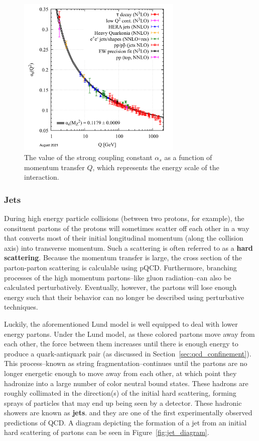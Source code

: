 \begin{figure}
    \centering
    \includegraphics[width=0.7\textwidth]{figures/introduction/running_coupling.png}
    \caption{The value of the strong coupling constant $\alpha_s$ as a function of momentum transfer $Q$, which represents the energy scale of the interaction.}
    \label{fig:asymptotic_freedom}
\end{figure}


\subsubsection{Jets}
\label{sec:jets}

During high energy particle collisions (between two protons, for example), the consituent partons of the protons will sometimes scatter off each other in a way that converts most of their initial longitudinal momentum (along the collision axis) into transverse momentum. Such a scattering is often referred to as a \textbf{hard scattering}. Because the momentum transfer is large, the cross section of the parton-parton scattering is calculable using pQCD. Furthermore, branching processes of the high momentum partons--like gluon radiation--can also be calculated perturbatively. Eventually, however, the partons will lose enough energy such that their behavior can no longer be described using perturbative techniques.

Luckily, the aforementioned Lund model is well equipped to deal with lower energy partons. Under the Lund model, as these colored partons move away from each other, the force between them increases until there is enough energy to produce a quark-antiquark pair (as discussed in Section~\ref{sec:qcd_confinement}). This process--known as string fragmentation--continues until the partons are no longer energetic enough to move away from each other, at which point they hadronize into a large number of color neutral bound states. These hadrons are roughly collimated in the direction(s) of the initial hard scattering, forming sprays of particles that may end up being seen by a detector. These hadronic showers are known as \textbf{jets}. and they are one of the first experimentally observed predictions of QCD. A diagram depicting the formation of a jet from an initial hard scattering of partons can be seen in Figure~\ref{fig:jet_diagram}. 

